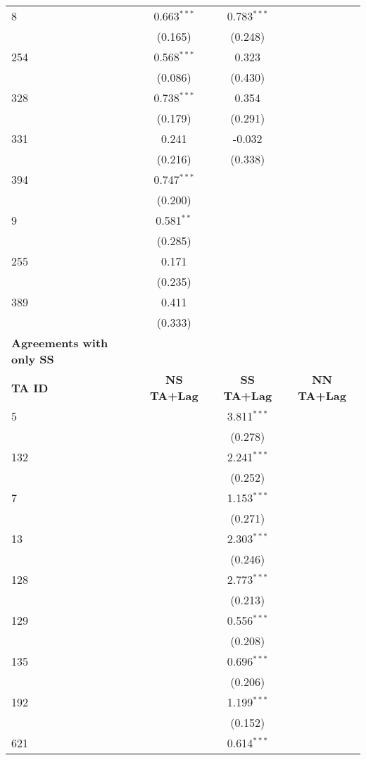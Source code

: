 \begin{center}
\begin{longtable}{lccc}
    8 & 0.663$^{\ast\ast\ast}$ & 0.783$^{\ast\ast\ast}$ &  \\
    & (0.165) & (0.248) &  \\
    254 & 0.568$^{\ast\ast\ast}$ & 0.323 &  \\
    & (0.086) & (0.430) &  \\
    328 & 0.738$^{\ast\ast\ast}$ & 0.354 &  \\
    & (0.179) & (0.291) &  \\
    331 & 0.241 & -0.032 &  \\
    & (0.216) & (0.338) &  \\
    394 & 0.747$^{\ast\ast\ast}$ &  &  \\
    & (0.200) &  &  \\
    9 & 0.581$^{\ast\ast}$ &  &  \\
    & (0.285) &  &  \\
    255 & 0.171 &  &  \\
    & (0.235) &  &  \\
    389 & 0.411 &  &  \\
    & (0.333) &  &  \\
    \hline
    \textbf{Agreements with only SS} &  &  &  \\
    \hline
    \textbf{TA ID} & \textbf{NS TA+Lag} & \textbf{SS TA+Lag} & \textbf{NN TA+Lag} \\
    \hline
    5   &  & 3.811$^{\ast\ast\ast}$ &  \\
    &  & (0.278) &  \\
    132 &  & 2.241$^{\ast\ast\ast}$ &  \\
    &  & (0.252) &  \\
    7   &  & 1.153$^{\ast\ast\ast}$ &  \\
    &  & (0.271) &  \\
    13  &  & 2.303$^{\ast\ast\ast}$ &  \\
    &  & (0.246) &  \\
    128 &  & 2.773$^{\ast\ast\ast}$ &  \\
    &  & (0.213) &  \\
    129 &  & 0.556$^{\ast\ast\ast}$ &  \\
    &  & (0.208) &  \\
    135 &  & 0.696$^{\ast\ast\ast}$ &  \\
    &  & (0.206) &  \\
    192 &  & 1.199$^{\ast\ast\ast}$ &  \\
    &  & (0.152) &  \\
    621 &  & 0.614$^{\ast\ast\ast}$ &  \\

\end{longtable}
\end{center}

